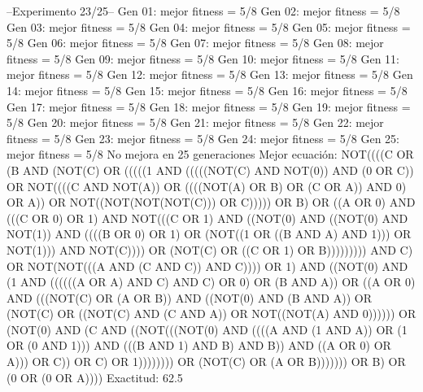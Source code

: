 --Experimento 
 23/25--
Gen 01: mejor fitness = 5/8
Gen 02: mejor fitness = 5/8
Gen 03: mejor fitness = 5/8
Gen 04: mejor fitness = 5/8
Gen 05: mejor fitness = 5/8
Gen 06: mejor fitness = 5/8
Gen 07: mejor fitness = 5/8
Gen 08: mejor fitness = 5/8
Gen 09: mejor fitness = 5/8
Gen 10: mejor fitness = 5/8
Gen 11: mejor fitness = 5/8
Gen 12: mejor fitness = 5/8
Gen 13: mejor fitness = 5/8
Gen 14: mejor fitness = 5/8
Gen 15: mejor fitness = 5/8
Gen 16: mejor fitness = 5/8
Gen 17: mejor fitness = 5/8
Gen 18: mejor fitness = 5/8
Gen 19: mejor fitness = 5/8
Gen 20: mejor fitness = 5/8
Gen 21: mejor fitness = 5/8
Gen 22: mejor fitness = 5/8
Gen 23: mejor fitness = 5/8
Gen 24: mejor fitness = 5/8
Gen 25: mejor fitness = 5/8
No mejora en 25 generaciones
Mejor ecuación: NOT((((C OR (B AND (NOT(C) OR (((((1 AND (((((NOT(C) AND NOT(0)) AND (0 OR C)) OR NOT((((C AND NOT(A)) OR ((((NOT(A) OR B) OR (C OR A)) AND 0) OR A)) OR NOT((NOT(NOT(NOT(C))) OR C))))) OR B) OR ((A OR 0) AND (((C OR 0) OR 1) AND NOT(((C OR 1) AND ((NOT(0) AND ((NOT(0) AND NOT(1)) AND ((((B OR 0) OR 1) OR (NOT((1 OR ((B AND A) AND 1))) OR NOT(1))) AND NOT(C)))) OR (NOT(C) OR ((C OR 1) OR B))))))))) AND C) OR NOT(NOT(((A AND (C AND C)) AND C)))) OR 1) AND ((NOT(0) AND (1 AND ((((((A OR A) AND C) AND C) OR 0) OR (B AND A)) OR ((A OR 0) AND (((NOT(C) OR (A OR B)) AND ((NOT(0) AND (B AND A)) OR (NOT(C) OR ((NOT(C) AND (C AND A)) OR NOT((NOT(A) AND 0)))))) OR (NOT(0) AND (C AND ((NOT(((NOT(0) AND ((((A AND (1 AND A)) OR (1 OR (0 AND 1))) AND (((B AND 1) AND B) AND B)) AND ((A OR 0) OR A))) OR C)) OR C) OR 1)))))))) OR (NOT(C) OR (A OR B))))))) OR B) OR (0 OR (0 OR A))))
 Exactitud: 62.5%

